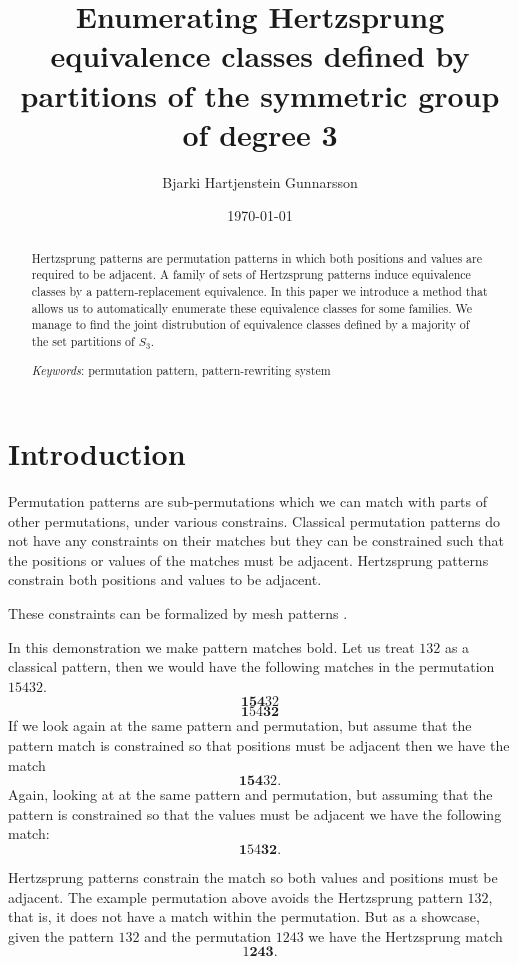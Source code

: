 \documentclass[a4paper, 11pt, english]{article}
\newcommand{\breath}{\vspace{6pt plus 2pt minus 1pt}\noindent}
\theoremstyle{definition}
\newcommand{\Sym}{S}
\begin{document}
\title{Enumerating Hertzsprung equivalence classes defined by partitions of the symmetric group of degree 3}
\author{Bjarki Hartjenstein Gunnarsson}
\date{\today}
\maketitle

\begin{abstract}
    Hertzsprung patterns are permutation patterns in which both positions and values are required to
    be adjacent. A family of sets of Hertzsprung patterns induce equivalence classes by
    a pattern-replacement equivalence. In this paper we introduce a method that allows us 
    to automatically enumerate these equivalence classes for some families. We manage to find the joint
    distrubution of equivalence classes defined by a majority of the set partitions of $\Sym_3$.

    \breath \emph{Keywords}: permutation pattern, pattern-rewriting system
\end{abstract}

\section{Introduction}
Permutation patterns are sub-permutations which we can match with parts of other
permutations, under various constrains. 
Classical permutation patterns do not have any constraints on their matches but they can
be constrained such that the positions or values of the matches must be adjacent.
Hertzsprung patterns constrain both positions and values to be adjacent. 

These constraints can be formalized by mesh patterns \cite{claesson:2011}.

In this demonstration we make pattern matches bold.  Let us treat $132$ as a classical
pattern, then we would have the following matches in the permutation $15432$.
\[
    \bm{154}32
\]
\[
    \bm{1}54\bm{32}
\]
If we look again at the same pattern and permutation, but assume that the
pattern match is constrained so that positions must be adjacent then we have the match
\[
    \bm{154}32.
\]
Again, looking at at the same pattern and permutation, but assuming that the
pattern is constrained so that the values must be adjacent we have the following
match:
\[
    \bm{1}54\bm{32}.
\]

Hertzsprung patterns constrain the match so both values and positions must be
adjacent. The example permutation above avoids the Hertzsprung pattern $132$, that is, it does not have a match
within the permutation. But as a showcase, given the pattern $132$ and the permutation $1243$ we
have the Hertzsprung match
\[
    1\bm{243}.
\]
\end{document}
